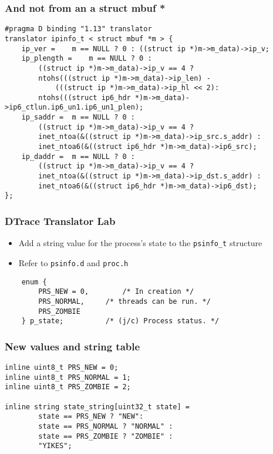 \documentclass[pdftex]{beamer}
\begin{document}
\begin{frame}[fragile]
  \frametitle{And not from an a struct mbuf *}
\begin{lstlisting}
#pragma D binding "1.13" translator
translator ipinfo_t < struct mbuf *m > {
	ip_ver =	m == NULL ? 0 : ((struct ip *)m->m_data)->ip_v;
	ip_plength =	m == NULL ? 0 :
	    ((struct ip *)m->m_data)->ip_v == 4 ?
	    ntohs(((struct ip *)m->m_data)->ip_len) - 
			(((struct ip *)m->m_data)->ip_hl << 2):
	    ntohs(((struct ip6_hdr *)m->m_data)->ip6_ctlun.ip6_un1.ip6_un1_plen);
	ip_saddr =	m == NULL ? 0 :
	    ((struct ip *)m->m_data)->ip_v == 4 ?
	    inet_ntoa(&((struct ip *)m->m_data)->ip_src.s_addr) :
	    inet_ntoa6(&((struct ip6_hdr *)m->m_data)->ip6_src);
	ip_daddr =	m == NULL ? 0 :
	    ((struct ip *)m->m_data)->ip_v == 4 ?
	    inet_ntoa(&((struct ip *)m->m_data)->ip_dst.s_addr) :
	    inet_ntoa6(&((struct ip6_hdr *)m->m_data)->ip6_dst);
};
\end{lstlisting}
\end{frame}

\begin{frame}[fragile]
  \frametitle{DTrace Translator Lab}
  \begin{itemize}
  \item Add a string value for the process's state to the
    \verb|psinfo_t| structure
  \item Refer to \verb|psinfo.d| and \verb|proc.h|
  \end{itemize}
\begin{lstlisting}
	enum {
		PRS_NEW = 0,		/* In creation */
		PRS_NORMAL,		/* threads can be run. */
		PRS_ZOMBIE
	} p_state;			/* (j/c) Process status. */
\end{lstlisting}
\end{frame}

\begin{frame}[fragile]
  \frametitle{New values and string table}
\begin{lstlisting}
inline uint8_t PRS_NEW = 0;
inline uint8_t PRS_NORMAL = 1;
inline uint8_t PRS_ZOMBIE = 2;

inline string state_string[uint32_t state] =
        state == PRS_NEW ? "NEW":
        state == PRS_NORMAL ? "NORMAL" :
        state == PRS_ZOMBIE ? "ZOMBIE" :
        "YIKES";
\end{lstlisting}
\end{frame}
\end{document}
